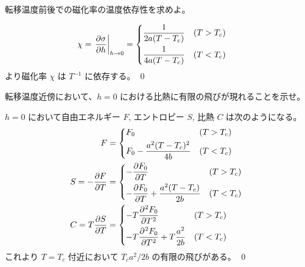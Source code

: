 \documentclass[uplatex,dvipdfmx,a4paper,11pt]{jlreq}
\makeatletter
\numberwithin{equation}{section}
\theoremstyle{definition}
\renewenvironment{proof}[1][\proofname]{\par
  \normalfont
  \topsep6\p@\@plus6\p@ \trivlist
  \item[\hskip\labelsep{\bfseries #1}\@addpunct{\bfseries}]\ignorespaces\quad\par
}{%
  \qed\endtrivlist\@endpefalse
}
\renewcommand\proofname{証明}
\makeatother
\begin{document}
\begin{problem}
転移温度前後での磁化率の温度依存性を求めよ。
\end{problem}
\begin{proof}
  \begin{align}
    \chi & = \left.\diffp{\sigma}{h}\right|_{h\to 0} = \begin{dcases}
                                                         \frac{1}{2a(T - T_c)} & (T > T_c) \\
                                                         \frac{1}{4a(T - T_c)} & (T < T_c) \\
                                                       \end{dcases}
  \end{align}
  より磁化率 $\chi$ は $T^{-1}$ に依存する。
\end{proof}

\begin{problem}
転移温度近傍において、$h = 0$ における比熱に有限の飛びが現れることを示せ。
\end{problem}
\begin{proof}
  $h = 0$ において自由エネルギー $F$, エントロピー $S$, 比熱 $C$ は次のようになる。
  \begin{align}
    F                 & =
    \begin{dcases}
      F_0                             & (T > T_c) \\
      F_0 - \frac{a^2(T - T_c)^2}{4b} & (T < T_c) \\
    \end{dcases}           \\
    S = -\diffp{F}{T} & =
    \begin{dcases}
      -\diffp{F_0}{T}                           & (T > T_c) \\
      -\diffp{F_0}{T} + \frac{a^2(T - T_c)}{2b} & (T < T_c) \\
    \end{dcases} \\
    C = T\diffp{S}{T} & =
    \begin{dcases}
      -T\diffp[2]{F_0}{T}                   & (T > T_c) \\
      -T\diffp[2]{F_0}{T} + T\frac{a^2}{2b} & (T < T_c) \\
    \end{dcases}
  \end{align}
  これより $T = T_c$ 付近において $T_ca^2/2b$ の有限の飛びがある。
\end{proof}
\end{document}
